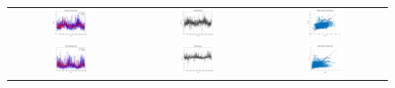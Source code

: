 \begin{figure}[ht!]
  \centering
  \begin{tabular}{ccc}
    \includegraphics[width=0.32\textwidth]{graphs/hybrid/120 hours/mean_fr/actual vs forecast.jpg} &
    \includegraphics[width=0.32\textwidth]{graphs/hybrid/120 hours/mean_fr/residuals.jpg} &
    \includegraphics[width=0.32\textwidth]{graphs/hybrid/120 hours/mean_fr/scatter plot.jpg} \\
    \includegraphics[width=0.32\textwidth]{graphs/hybrid/120 hours/s_wht/actual vs forecast.jpg} &
    \includegraphics[width=0.32\textwidth]{graphs/hybrid/120 hours/s_wht/residuals.jpg} &
    \includegraphics[width=0.32\textwidth]{graphs/hybrid/120 hours/s_wht/scatter plot.jpg} \\

\end{tabular}
\end{figure}

